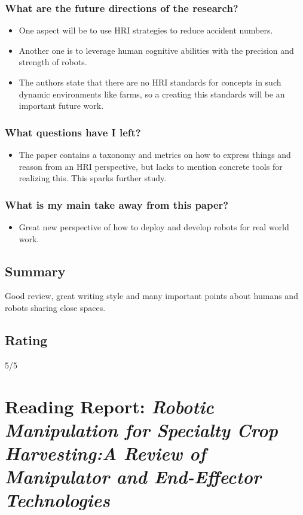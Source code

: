 \documentclass{article}
\begin{document}
\subsubsection*{What are the future directions of the research?}
\begin{itemize}
    \item One aspect will be to use HRI strategies to reduce accident numbers.
    \item Another one is to leverage human cognitive abilities with the precision and strength of robots.
    \item The authors state that there are no HRI standards for concepts in such dynamic environments like farms, so a creating this standards will be an important future work.
\end{itemize}
\subsubsection*{What questions have I left?}
\begin{itemize}
    \item The paper contains a taxonomy and metrics on how to express things and reason from an HRI perspective, but lacks to mention concrete tools for realizing this. This sparks further study.
\end{itemize}
\subsubsection*{What is my main take away from this paper?}
\begin{itemize}
    \item Great new perspective of how to deploy and develop robots for real world work.
\end{itemize}

\subsection*{Summary}
Good review, great writing style and many important points about humans and robots sharing close spaces. 

\subsection*{Rating}
5/5


\section{Reading Report: \emph{Robotic Manipulation for Specialty Crop Harvesting:A Review of Manipulator and End-Effector Technologies}}
\cite{Davidson2020}
\end{document}
